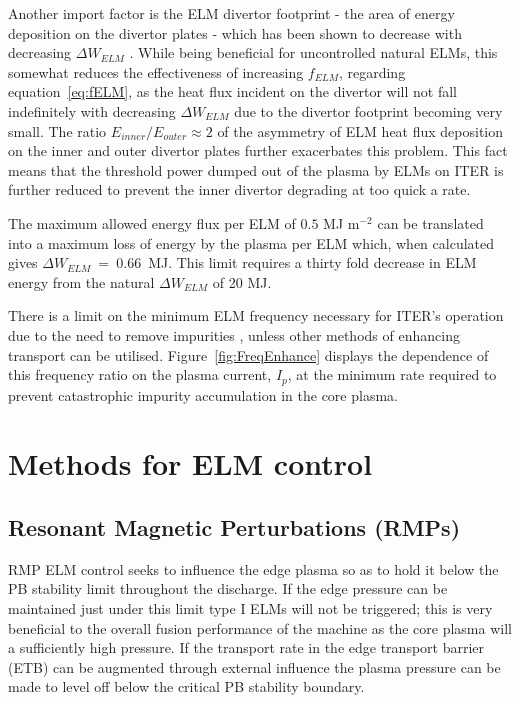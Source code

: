 \documentclass[11pt, twocolumn]{article}  %
\begin{document}
Another import factor is the ELM divertor footprint - the area of energy deposition on the divertor plates - which has been shown to decrease with decreasing $\Delta W_{ELM}$ \cite{Eich2011}. While being beneficial for uncontrolled natural ELMs, this somewhat reduces the effectiveness of increasing $f_{ELM}$, regarding equation~\ref{eq:fELM}, as the heat flux incident on the divertor will not fall indefinitely with decreasing $\Delta W_{ELM}$ due to the divertor footprint becoming very small. The ratio $E_{inner}/E_{outer} \approx 2$ \cite{Eich2007} of the asymmetry of ELM heat flux deposition on the inner and outer divertor plates further exacerbates this problem. This fact means that the threshold power dumped out of the plasma by ELMs on ITER is further reduced to prevent the inner divertor degrading at too quick a rate.

The maximum allowed energy flux per ELM of $0.5$ MJ m$^{-2}$ can be translated into a maximum loss of energy by the plasma per ELM which, when calculated gives $\Delta W_{ELM}~=~0.66$~MJ\cite{Loarte2010conf}. This limit requires a thirty fold decrease in ELM energy from the natural $\Delta W_{ELM}$ of 20 MJ. 

There is a limit on the minimum ELM frequency necessary for ITER's operation due to the need to remove impurities \cite{Loarte2014a}, unless other methods of enhancing transport can be utilised. Figure~\ref{fig:FreqEnhance} displays the dependence of this frequency ratio on the plasma current, $I_p$, at the minimum rate required to prevent catastrophic impurity accumulation in the core plasma.

\section{Methods for ELM control}\label{sec:Control}

\subsection{Resonant Magnetic Perturbations (RMPs)}\label{ssec:RMP}
RMP ELM control seeks to influence the edge plasma so as to hold it below the PB stability limit throughout the discharge. If the edge pressure can be maintained just under this limit type I ELMs will not be triggered; this is very beneficial to the overall fusion performance of the machine as the core plasma will a sufficiently high pressure. If the transport rate in the edge transport barrier (ETB) can be augmented through external influence the plasma pressure can be made to level off below the critical PB stability boundary. 
\end{document}
